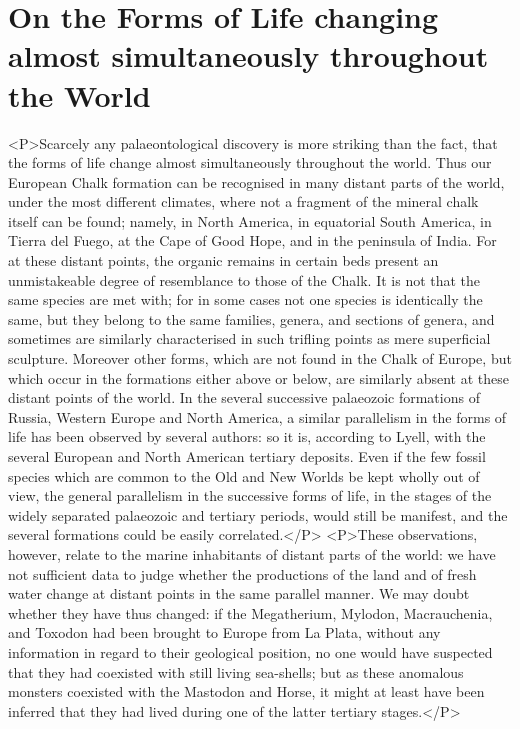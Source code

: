\section{On the Forms of Life changing almost simultaneously throughout the World}
<P>Scarcely any palaeontological discovery is more striking than the fact, that the forms of life change almost simultaneously throughout the world. Thus our European Chalk formation can be recognised in many distant parts of the world, under the most different climates, where not a fragment of the mineral chalk itself can be found; namely, in North America, in equatorial South America, in Tierra del Fuego, at the Cape of Good Hope, and in the peninsula of India. For at these distant points, the organic remains in certain beds present an unmistakeable degree of resemblance to those of the Chalk. It is not that the same species are met with; for in some cases not one species is identically the same, but they belong to the same families, genera, and sections of genera, and sometimes are similarly characterised in such trifling points as mere superficial sculpture. Moreover other forms, which are not found in the Chalk of Europe, but which occur in the formations either above or below, are similarly absent at these distant points of the world. In the several successive palaeozoic formations of Russia, Western Europe and North America, a similar parallelism in the forms of life has been observed by several authors: so it is, according to Lyell, with the several European and North American tertiary deposits.  Even if the few fossil species which are common to the Old and New Worlds be kept wholly out of view, the general parallelism in the successive forms of life, in the stages of the widely separated palaeozoic and tertiary periods, would still be manifest, and the several formations could be easily correlated.</P>
<P>These observations, however, relate to the marine inhabitants of distant parts of the world: we have not sufficient data to judge whether the productions of the land and of fresh water change at distant points in the same parallel manner. We may doubt whether they have thus changed: if the Megatherium, Mylodon, Macrauchenia, and Toxodon had been brought to Europe from La Plata, without any information in regard to their geological position, no one would have suspected that they had coexisted with still living sea-shells; but as these anomalous monsters coexisted with the Mastodon and Horse, it might at least have been inferred that they had lived during one of the latter tertiary stages.</P>
